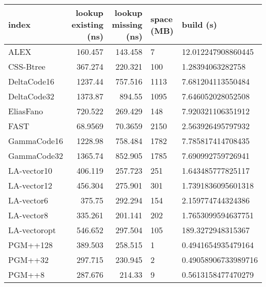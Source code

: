 \begin{tabular}{lrrll}
\hline
 index             &   lookup existing (ns) &   lookup missing (ns) & space (MB)   & build (s)             \\
\hline
 ALEX              &               160.457  &              143.458  & 7            & 12.012247908860445    \\
 CSS-Btree         &               367.274  &              220.321  & 100          & 1.28394063282758      \\
 DeltaCode16       &              1237.44   &              757.516  & 1113         & 7.681204113550484     \\
 DeltaCode32       &              1373.87   &              894.55   & 1095         & 7.646052028052508     \\
 EliasFano         &               720.522  &              269.429  & 148          & 7.920321106351912     \\
 FAST              &                68.9569 &               70.3659 & 2150         & 2.563926495797932     \\
 GammaCode16       &              1228.98   &              758.484  & 1782         & 7.785817414708435     \\
 GammaCode32       &              1365.74   &              852.905  & 1785         & 7.690992759726941     \\
 LA-vector10       &               406.119  &              257.723  & 251          & 1.643485777825117     \\
 LA-vector12       &               456.304  &              275.901  & 301          & 1.7391836095601318    \\
 LA-vector6        &               375.75   &              292.294  & 154          & 2.159774744324386     \\
 LA-vector8        &               335.261  &              201.141  & 202          & 1.7653099594637751    \\
 LA-vectoropt      &               546.652  &              297.504  & 105          & 189.3272948315367     \\
 PGM++128          &               389.503  &              258.515  & 1            & 0.4941654935479164    \\
 PGM++32           &               297.715  &              230.945  & 2            & 0.49058906733989716   \\
 PGM++8            &               287.676  &              214.33   & 9            & 0.5613158477470279    \\

\end{tabular}
